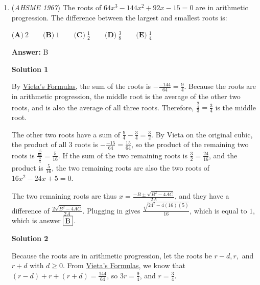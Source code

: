 \begin{enumerate}
\textbf{Solution}

WLOG, let's assume that $\triangle ABC$ is equilateral. Therefore, $[ABC]=\frac{(1+n)^2\sqrt3}{4}$ and $[DBE]=[ADF]=[EFC]=n \cdot \sin(60)/2$. Then $[DEF]=\frac{(n^2-n+1)\sqrt3}{4}$. Finding the ratio yields $\fbox{A}$.  -Dark\_Lord

 


	\item (\textit{AHSME 1967}) The roots of $64x^3-144x^2+92x-15=0$ are in arithmetic progression.  The difference between the largest and smallest roots is:


 $\textbf{(A)}\ 2\qquad \textbf{(B)}\ 1\qquad \textbf{(C)}\ \frac{1}{2}\qquad \textbf{(D)}\ \frac{3}{8}\qquad \textbf{(E)}\ \frac{1}{4}$

 \textbf{Answer: }B



\textbf{Solution 1}

By \href{https://artofproblemsolving.com/wiki/index.php?title=Vieta\%27s\_Formulas}{Vieta's Formulas}, the sum of the roots is $-\frac{-144}{64} = \frac{9}{4}$.  Because the roots are in arithmetic progression, the middle root is the average of the other two roots, and is also the average of all three roots.  Therefore, $\frac{\frac{9}{4}}{3} = \frac{3}{4}$ is the middle root.

 The other two roots have a sum of $\frac{9}{4} - \frac{3}{4} = \frac{3}{2}$.  By Vieta on the original cubic, the product of all $3$ roots is $-\frac{-15}{64} = \frac{15}{64}$, so the product of the remaining two roots is $\frac{\frac{15}{64}}{\frac{3}{4}} = \frac{5}{16}$.  If the sum of the two remaining roots is $\frac{3}{2} = \frac{24}{16}$, and the product is $\frac{5}{16}$, the two remaining roots are also the two roots of $16x^2 - 24x + 5 = 0$.

 The two remaining roots are thus $x = \frac{-B \pm \sqrt{B^2 - 4AC}}{2A}$, and they have a difference of $\frac{2\sqrt{B^2 - 4AC}}{2A}$.  Plugging in gives $\frac{\sqrt{24^2 - 4(16)(5)}}{16}$, which is equal to $1$, which is answer $\fbox{B}$.

 



\textbf{Solution 2}

Because the roots are in arithmetic progression, let the roots be $r-d, r,$ and $r+d$ with $d \geq 0$. From \href{https://artofproblemsolving.com/wiki/index.php?title=Vieta\%27s\_Formulas}{Vieta's Formulas}, we know that $(r-d)+r+(r+d)=\frac{144}{64}$, so $3r=\frac 9 4$, and $r=\frac 3 4$.


\end{enumerate}
